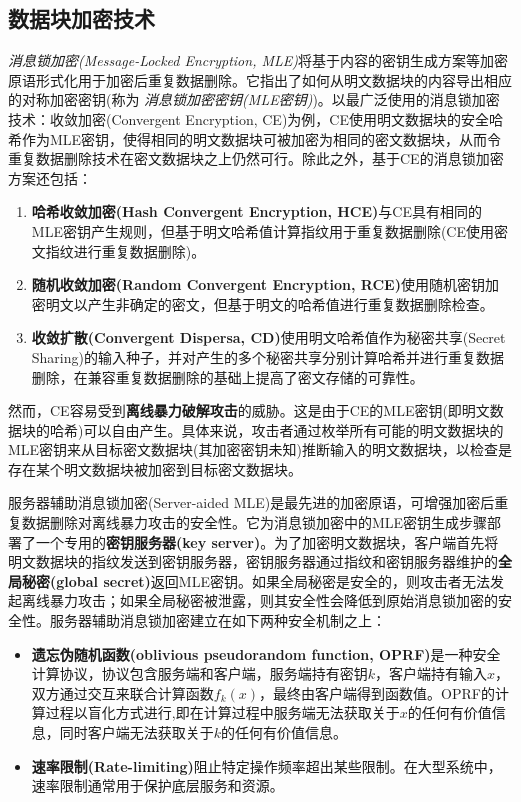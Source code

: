 \subsection{数据块加密技术}
\label{subsec:background-encrypted-deduplication-key}

\textit{消息锁加密(Message-Locked Encryption, MLE)}\cite{bellare2013MLE}将基于内容的密钥生成方案等加密原语形式化用于加密后重复数据删除。它指出了如何从明文数据块的内容导出相应的对称加密密钥(称为 \textit{消息锁加密密钥(MLE密钥)})。以最广泛使用的消息锁加密技术：收敛加密(Convergent Encryption, CE)\cite{douceur2002reclaiming}为例，CE使用明文数据块的安全哈希作为MLE密钥，使得相同的明文数据块可被加密为相同的密文数据块，从而令重复数据删除技术在密文数据块之上仍然可行。除此之外，基于CE的消息锁加密方案还包括：

\begin{enumerate}[leftmargin=*]
    \item \textbf{哈希收敛加密(Hash Convergent Encryption, HCE)}\cite{douceur2002reclaiming}与CE具有相同的MLE密钥产生规则，但基于明文哈希值计算指纹用于重复数据删除(CE使用密文指纹进行重复数据删除)。
    \item \textbf{随机收敛加密(Random Convergent Encryption, RCE)}\cite{douceur2002reclaiming}使用随机密钥加密明文以产生非确定的密文，但基于明文的哈希值进行重复数据删除检查。
    \item \textbf{收敛扩散(Convergent Dispersa, CD)}\cite{li2016cdstore}使用明文哈希值作为秘密共享(Secret Sharing)的输入种子，并对产生的多个秘密共享分别计算哈希并进行重复数据删除，在兼容重复数据删除的基础上提高了密文存储的可靠性。
\end{enumerate}

然而，CE容易受到\textbf{离线暴力破解攻击}的威胁。这是由于CE的MLE密钥(即明文数据块的哈希)可以自由产生。具体来说，攻击者通过枚举所有可能的明文数据块的MLE密钥来从目标密文数据块(其加密密钥未知)推断输入的明文数据块，以检查是存在某个明文数据块被加密到目标密文数据块。

服务器辅助消息锁加密(Server-aided MLE)\cite{bellare2013DupLESS}是最先进的加密原语，可增强加密后重复数据删除对离线暴力攻击的安全性。它为消息锁加密中的MLE密钥生成步骤部署了一个专用的\textbf{密钥服务器(key server)}。为了加密明文数据块，客户端首先将明文数据块的指纹发送到密钥服务器，密钥服务器通过指纹和密钥服务器维护的\textbf{全局秘密(global secret)}返回MLE密钥。如果全局秘密是安全的，则攻击者无法发起离线暴力攻击；如果全局秘密被泄露，则其安全性会降低到原始消息锁加密的安全性。服务器辅助消息锁加密建立在如下两种安全机制之上：

\begin{itemize}[leftmargin=*]
    \item \textbf{遗忘伪随机函数(oblivious pseudorandom function, OPRF)}\cite{naor2004Number}是一种安全计算协议，协议包含服务端和客户端，服务端持有密钥$k$，客户端持有输入$x$，双方通过交互来联合计算函数$f_k(x)$，最终由客户端得到函数值。OPRF的计算过程以盲化方式进行,即在计算过程中服务端无法获取关于$x$的任何有价值信息，同时客户端无法获取关于$k$的任何有价值信息。
    \item \textbf{速率限制(Rate-limiting)}\cite{bellare2013DupLESS}阻止特定操作频率超出某些限制。在大型系统中，速率限制通常用于保护底层服务和资源。
\end{itemize}

